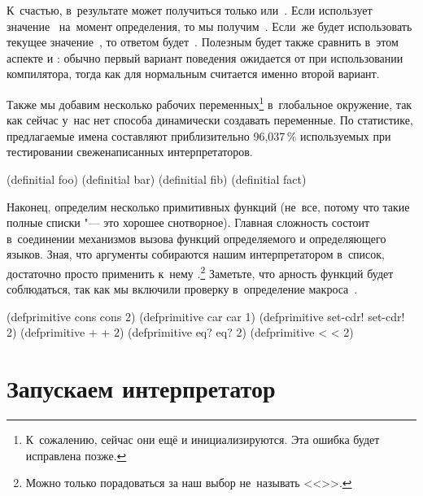 К~счастью, в~результате может получиться только  или~. Если
 использует значение~ на~момент определения, то мы
получим~. Если~же  будет использовать текущее
значение~, то ответом будет~. Полезным будет также сравнить в~этом
аспекте  и : обычно первый вариант поведения ожидается
от  при использовании компилятора, тогда как для 
нормальным считается именно второй вариант.

Также мы добавим несколько рабочих переменных\footnote{К~сожалению, сейчас они
ещё и инициализируются. Эта ошибка будет исправлена позже.} в~глобальное
окружение, так как сейчас у~нас нет способа динамически создавать переменные.
По статистике, предлагаемые имена составляют приблизительно {96,037\,\%}
используемых при тестировании свеженаписанных интерпретаторов.


\begin{code:lisp}
(definitial foo)
(definitial bar)
(definitial fib)
(definitial fact)
\end{code:lisp}


Наконец, определим несколько примитивных функций (не~все, потому что такие
полные списки "--- это хорошее снотворное). Главная сложность состоит
в~соединении механизмов вызова функций определяемого и определяющего языков.
Зная, что аргументы собираются нашим интерпретатором в~список, достаточно просто
применить
к~нему .\footnote*{Можно только порадоваться за наш выбор не~называть
 <<>>.} Заметьте, что арность функций будет соблюдаться,
так как мы включили проверку в~определение макроса~.

\begin{code:lisp}
(defprimitive cons cons 2)
(defprimitive car car 1)
(defprimitive set-cdr! set-cdr! 2)
(defprimitive + + 2)
(defprimitive eq? eq? 2)
(defprimitive < < 2)
\end{code:lisp}


\section{Запускаем интерпретатор}\label{basics/sect:starting-the-interpreter}

